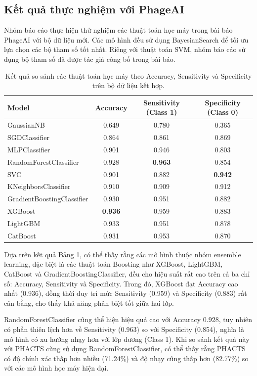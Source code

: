 \subsection{Kết quả thực nghiệm với PhageAI}
Nhóm báo cáo thực hiện thử nghiệm các thuật toán học máy trong bài báo PhageAI với bộ dữ liệu mới. Các mô hình đều sử dụng BayesianSearch để tối ưu lựa chọn các bộ tham số tốt nhất. Riêng với thuật toán SVM, nhóm báo cáo sử dụng bộ tham số đã được tác giả công bố trong bài báo.
\begin{table}[ht]
\footnotesize
\centering
\begin{tabular}{|l|c|c|c|}
\hline
\textbf{Model} & \textbf{Accuracy} & \textbf{Sensitivity (Class 1)} & \textbf{Specificity (Class 0)} \\
\hline
GaussianNB & 0.649 & 0.780 & 0.365 \\
SGDClassifier & 0.864 & 0.861 & 0.869 \\
MLPClassifier & 0.901 & 0.946 & 0.803 \\
RandomForestClassifier & 0.928 & \textbf{0.963} & 0.854 \\
SVC & 0.901 & 0.882 & \textbf{0.942} \\
KNeighborsClassifier & 0.910 & 0.909 & 0.912 \\
GradientBoostingClassifier & 0.930 & 0.951 & 0.882 \\
XGBoost & \textbf{0.936} & 0.959 & 0.883 \\
LightGBM & 0.933 & 0.951 & 0.878 \\
CatBoost & 0.931 & 0.953 & 0.870 \\
\hline
\end{tabular}


\caption{Kết quả so sánh các thuật toán học máy theo Accuracy, Sensitivity và Specificity trên bộ dữ liệu kết hợp.}
\label{tab:model_comparison}
\end{table}

Dựa trên kết quả Bảng \ref{tab:model_comparison}, có thể thấy rằng các mô hình thuộc nhóm ensemble learning, đặc biệt là các thuật toán Boosting như XGBoost, LightGBM, CatBoost và GradientBoostingClassifier, đều cho hiệu suất rất cao trên cả ba chỉ số: Accuracy, Sensitivity và Specificity. Trong đó, XGBoost đạt Accuracy cao nhất (0.936), đồng thời duy trì mức Sensitivity (0.959) và Specificity (0.883) rất cân bằng, cho thấy khả năng phân biệt tốt giữa hai lớp.

RandomForestClassifier cũng thể hiện hiệu quả cao với Accuracy 0.928, tuy nhiên có phần thiên lệch hơn về Sensitivity (0.963) so với Specificity (0.854), nghĩa là mô hình có xu hướng nhạy hơn với lớp dương (Class 1). Khi so sánh kết quả này với PHACTS cũng sử dụng RandomForestClassifier, có thể thấy rằng PHACTS có độ chính xác thấp hơn nhiều (71.24\%) và độ nhạy cũng thấp hơn (82.77\%) so với các mô hình học máy hiện đại. 

